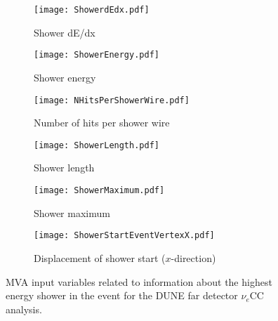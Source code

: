 \begin{figure}
  \centering
  \begin{subfigure}[t]{0.4\linewidth}
    \centering
    \texttt{[image: ShowerdEdx.pdf]}
    \caption{Shower dE/dx}
  \end{subfigure}
  \begin{subfigure}[t]{0.4\linewidth}
    \centering
    \texttt{[image: ShowerEnergy.pdf]}
    \caption{Shower energy}
  \end{subfigure}
  \begin{subfigure}[t]{0.4\linewidth}
    \centering
    \texttt{[image: NHitsPerShowerWire.pdf]}
    \caption{Number of hits per shower wire}
  \end{subfigure}
  \begin{subfigure}[t]{0.4\linewidth}
    \centering
    \texttt{[image: ShowerLength.pdf]}
    \caption{Shower length}
  \end{subfigure}
  \begin{subfigure}[t]{0.4\linewidth}
    \centering
    \texttt{[image: ShowerMaximum.pdf]}
    \caption{Shower maximum}
  \end{subfigure}
  \begin{subfigure}[t]{0.4\linewidth}
    \centering
    \texttt{[image: ShowerStartEventVertexX.pdf]}
    \caption{Displacement of shower start ($x$-direction)}
  \end{subfigure}
  \caption[MVA input variables related to information about the highest energy shower in the event for the DUNE far detector $\nu_e$CC analysis.]{MVA input variables related to information about the highest energy shower in the event for the DUNE far detector $\nu_e$CC analysis.}
  \label{fig:FDMVAShowerVariables}
\end{figure}

